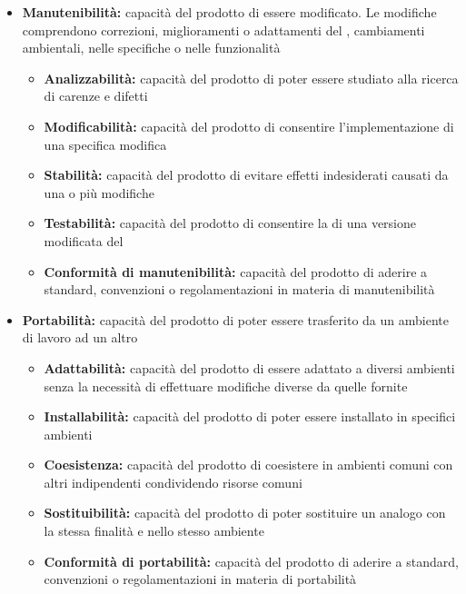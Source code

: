 \documentclass[12pt,a4paper]{article}
\begin{document}
\begin{itemize}
	\item \textbf{Manutenibilità:} capacità del prodotto  di essere modificato. Le modifiche comprendono correzioni, miglioramenti o adattamenti del , cambiamenti ambientali, nelle specifiche o nelle funzionalità
	\begin{itemize}
		\item \textbf{Analizzabilità:} capacità del prodotto  di poter essere studiato alla ricerca di carenze e difetti
		\item \textbf{Modificabilità:} capacità del prodotto  di consentire l'implementazione di una specifica modifica
		\item \textbf{Stabilità:} capacità del prodotto  di evitare effetti indesiderati causati da una o più modifiche
		\item \textbf{Testabilità:} capacità del prodotto  di consentire la  di una versione modificata del  
		\item \textbf{Conformità di manutenibilità:} capacità del prodotto  di aderire a standard, convenzioni o regolamentazioni in materia di manutenibilità
	\end{itemize}
	
	\item \textbf{Portabilità:} capacità del prodotto  di poter essere trasferito da un ambiente di lavoro ad un altro
	\begin{itemize}
		\item \textbf{Adattabilità:} capacità del prodotto  di essere adattato a diversi ambienti senza la necessità di effettuare modifiche diverse da quelle fornite
		\item \textbf{Installabilità:} capacità del prodotto  di poter essere installato in specifici ambienti
		\item \textbf{Coesistenza:} capacità del prodotto  di coesistere in ambienti comuni con altri   indipendenti condividendo risorse comuni
		\item \textbf{Sostituibilità:} capacità del prodotto  di poter sostituire un  analogo con la stessa finalità e nello stesso ambiente
		\item \textbf{Conformità di portabilità:} capacità del prodotto  di aderire a standard, convenzioni o regolamentazioni in materia di portabilità
	\end{itemize}
\end{itemize}
\end{document}
